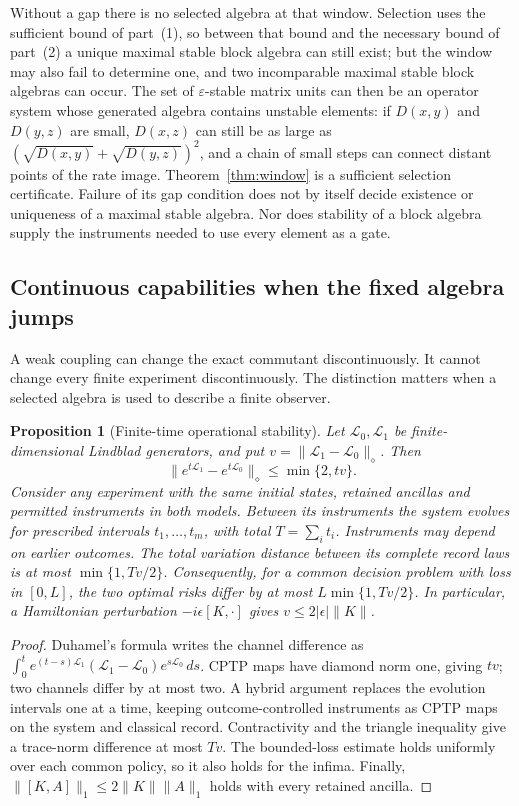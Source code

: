 \documentclass[12pt,a4paper]{article}
\newtheorem{proposition}[theorem]{Proposition}
\begin{document}
Without a gap there is no selected algebra at that window. Selection uses the sufficient bound of part~(1), so between that bound and the necessary bound of part~(2) a unique maximal stable block algebra can still exist; but the window may also fail to determine one, and two incomparable maximal stable block algebras can occur. The set of $\varepsilon$-stable matrix units can then be an operator system whose generated algebra contains unstable elements: if $D(x,y)$ and $D(y,z)$ are small, $D(x,z)$ can still be as large as $(\sqrt{D(x,y)}+\sqrt{D(y,z)})^2$, and a chain of small steps can connect distant points of the rate image. Theorem~\ref{thm:window} is a sufficient selection certificate. Failure of its gap condition does not by itself decide existence or uniqueness of a maximal stable algebra. Nor does stability of a block algebra supply the instruments needed to use every element as a gate.

\subsection{Continuous capabilities when the fixed algebra jumps}
\label{sec:noncommuting}

A weak coupling can change the exact commutant discontinuously. It cannot
change every finite experiment discontinuously. The distinction matters
when a selected algebra is used to describe a finite observer.

\begin{proposition}[Finite-time operational stability]
\label{prop:operational-stability}
Let $\mathcal L_0,\mathcal L_1$ be finite-dimensional Lindblad generators,
and put $v=\|\mathcal L_1-\mathcal L_0\|_\diamond$. Then
\begin{equation}\label{eq:duhamel-stability}
 \|e^{t\mathcal L_1}-e^{t\mathcal L_0}\|_\diamond
 \le\min\{2,tv\}.
\end{equation}
Consider any experiment with the same initial states, retained ancillas
and permitted instruments in both models. Between its instruments the
system evolves for prescribed intervals $t_1,\ldots,t_m$, with total
$T=\sum_i t_i$. Instruments may depend on earlier outcomes. The total
variation distance between its complete record laws is at most
$\min\{1,Tv/2\}$. Consequently, for a common decision problem with loss
in $[0,L]$, the two optimal risks differ by at most
$L\min\{1,Tv/2\}$. In particular, a Hamiltonian perturbation
$-i\epsilon[K,\cdot]$ gives $v\le2|\epsilon|\|K\|$.
\end{proposition}
\begin{proof}
Duhamel's formula writes the channel difference as
$\int_0^t e^{(t-s)\mathcal L_1}(\mathcal L_1-\mathcal L_0)
e^{s\mathcal L_0}\,ds$. CPTP maps have diamond norm one, giving $tv$;
two channels differ by at most two. A hybrid argument replaces the
evolution intervals one at a time, keeping outcome-controlled
instruments as CPTP maps on the system and classical record. Contractivity
and the triangle inequality give a trace-norm difference at most $Tv$.
The bounded-loss estimate holds uniformly over each common policy, so
it also holds for the infima. Finally,
$\|[K,A]\|_1\le2\|K\|\|A\|_1$ holds with every retained ancilla.
\end{proof}
\end{document}
